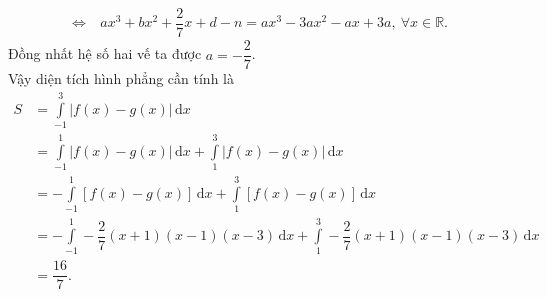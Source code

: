 \begin{bt}
{\[\begin{aligned}
\Leftrightarrow & \ ax^3+bx^2+\dfrac{2}{7}x+d-n=ax^3-3ax^2-ax+3a, \ \forall x\in\mathbb{R}.
\end{aligned}\]
Đồng nhất hệ số hai vế ta được $a=-\dfrac{2}{7}$. \\
Vậy diện tích hình phẳng cần tính là
\[
\begin{aligned}
S
&=\displaystyle\int\limits_{-1}^{3} |f(x)-g(x)|\mathrm{\,d}x \\
&=\displaystyle\int\limits_{-1}^{1} |f(x)-g(x)|\mathrm{\,d}x+\displaystyle\int\limits_{1}^{3} |f(x)-g(x)|\mathrm{\,d}x \\
&=-\displaystyle\int\limits_{-1}^{1} [f(x)-g(x)]\mathrm{\,d}x+\displaystyle\int\limits_{1}^{3} [f(x)-g(x)]\mathrm{\,d}x \\
&=-\displaystyle\int\limits_{-1}^{1} -\dfrac{2}{7}(x+1)(x-1)(x-3)\mathrm{\,d}x+\displaystyle\int\limits_{1}^{3} -\dfrac{2}{7}(x+1)(x-1)(x-3)\mathrm{\,d}x \\
&=\dfrac{16}{7}.
\end{aligned}\]





\begin{eqnarray*}






\end{eqnarray*}






\begin{eqnarray*}




\end{eqnarray*}
	}
\end{bt}

